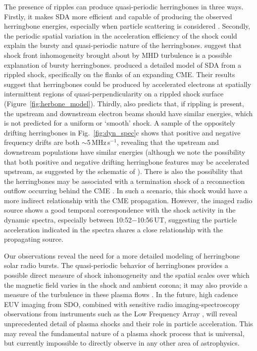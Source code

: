 The presence of ripples can produce quasi-periodic herringbones in three ways. Firstly, it makes SDA more efficient and capable of producing the observed herringbone energies, especially when particle scattering is considered \citep{burgess2006}. Secondly, the periodic spatial variation in the acceleration efficiency of the shock could explain the bursty and quasi-periodic nature of the herringbones. \cite{guo2010} suggest that shock front inhomogeneity brought about by MHD turbulence is a possible explanation of bursty herringbones. \cite{schmidt2012} produced a detailed model of SDA from a rippled shock, specifically on the flanks of an expanding CME. Their results suggest that herringbones could be produced by accelerated electrons at spatially intermittent regions of quasi-perpendicularity on a rippled shock surface (Figure~\ref{fig:herbone_model}). Thirdly, \citep{burgess2006} also predicts that, if rippling is present, the upstream and downstream electron beams should have similar energies, which is not predicted for a uniform or \textquoteleft smooth' shock. A sample of the oppositely drifting herringbones in Fig.~\ref{fig:dyn_spec}c shows that positive and negative frequency drifts are both $\sim$5\,MHz\,s$^{-1}$, revealing that the upstream and downstream populations have similar energies (although we note the possibility that both positive and negative drifting herringbone features may be accelerated upstream, as suggested by the schematic of \citep{zlobec1993}). There is also the possibility that the herringbones may be associated with a termination shock of a reconnection outflow occurring behind the CME \citep{aurass2004}. In such a scenario, this shock would have a more indirect relationship with the CME propagation. However, the imaged radio source shows a good temporal correspondence with the shock activity in the dynamic spectra, especially between 10:52$-$10:56\,UT, suggesting the particle acceleration indicated in the spectra shares a close relationship with the propagating source.

Our observations reveal the need for a more detailed modeling of herringbone solar radio bursts. The quasi-periodic behavior of herringbones provides a possible direct measure of shock inhomogeneity and the spatial scales over which the magnetic field varies in the shock and ambient corona; it may also provide a measure of the turbulence in these plasma flows \citep{guo2010}. In the future, high cadence EUV imaging from SDO, combined with sensitive radio imaging-spectroscopy observations from instruments such as the Low Frequency Array \citep[LOFAR;][]{vanHaarlem2013}, will reveal unprecedented detail of plasma shocks and their role in particle acceleration. This may reveal the fundamental nature of a plasma shock process that is universal, but currently impossible to directly observe in any other area of astrophysics. 


